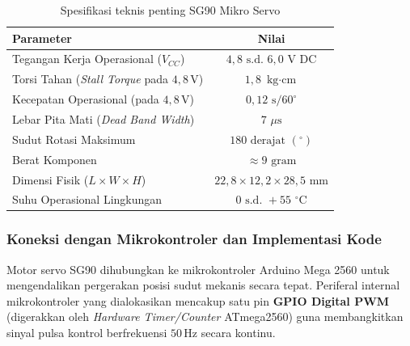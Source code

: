 \begin{table}[H]
	\centering
	\caption{Spesifikasi teknis penting SG90 Mikro Servo}
	\label{tab:sg90_spesifikasi}
	\small
	\begin{tabularx}{\textwidth}{@{} X c @{}}
		\toprule
		Parameter                                                  & Nilai                                            \\
		\midrule
		Tegangan Kerja Operasional ($V_{CC}$)                      & $4{,}8 \text{ s.d. } 6{,}0$ $\text{V DC}$          \\
		Torsi Tahan (\textit{Stall Torque} pada $4{,}8\,\text{V}$) & $1{,}8$ $\text{kg}\cdot\text{cm}$                \\
		Kecepatan Operasional (pada $4{,}8\,\text{V}$)             & $0{,}12$ $\text{s} / 60^\circ$                   \\
		Lebar Pita Mati (\textit{Dead Band Width})                 & $7$ $\mu\text{s}$                                \\
		Sudut Rotasi Maksimum                                      & $180$ $\text{derajat } (^\circ)$                 \\
		Berat Komponen                                             & $\approx 9$ $\text{gram}$                        \\
		Dimensi Fisik ($L \times W \times H$)                      & $22{,}8 \times 12{,}2 \times 28{,}5$ $\text{mm}$ \\
		Suhu Operasional Lingkungan                                & $0 \text{ s.d. } +55$ $^\circ\text{C}$             \\
		\bottomrule
	\end{tabularx}
\end{table}

\subsubsection{Koneksi dengan Mikrokontroler dan Implementasi Kode}
Motor servo SG90 dihubungkan ke mikrokontroler Arduino Mega 2560 untuk mengendalikan pergerakan posisi sudut mekanis secara tepat. Periferal internal mikrokontroler yang dialokasikan mencakup satu pin \textbf{GPIO Digital PWM} (digerakkan oleh \textit{Hardware Timer/Counter} ATmega2560) guna membangkitkan sinyal pulsa kontrol berfrekuensi $50\,\text{Hz}$ secara kontinu.


